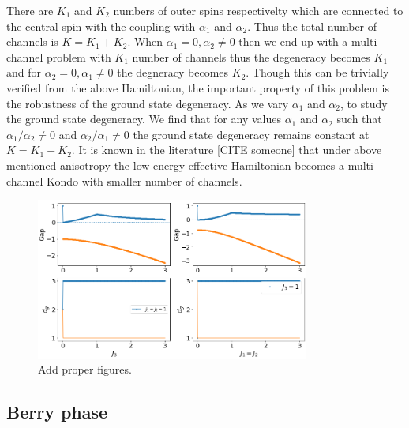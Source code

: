 \documentclass[reprint,prb,superscriptaddress]{revtex4-2}
\begin{document}
%
%
%
There are $K_1$ and $K_2$ numbers of outer spins respectivelty which are connected to the central spin with the coupling with $\alpha_1$ and $\alpha_2$. Thus the total number of channels is $K=K_1+K_2$. When $\alpha_1=0, \alpha_2\neq 0$ then we end up with a multi-channel problem with $K_1$ number of channels thus the degeneracy becomes $K_1$ and for $\alpha_2=0, \alpha_1\neq 0$ the degneracy becomes $K_2$. Though this can be trivially verified from the above Hamiltonian, the important property of this problem is the robustness of the ground state degeneracy. As we vary $\alpha_1$ and $\alpha_2$, to study the ground state degeneracy. We find that for any values $\alpha_1$  and $\alpha_2$ such that $\alpha_1/\alpha_2\neq 0$ and $\alpha_2/\alpha_1\neq 0$ the ground state degeneracy remains constant at $K=K_1+K_2$. It is known in the literature [CITE someone] that under above mentioned anisotropy the low energy effective Hamiltonian becomes a multi-channel Kondo with smaller number of channels.

\begin{figure}\centering
\includegraphics[width=0.8\textwidth]{plt/Anisotropy_Channel:3}
\caption{Add proper figures.}
\end{figure}

\subsection{Berry phase}
\end{document}
